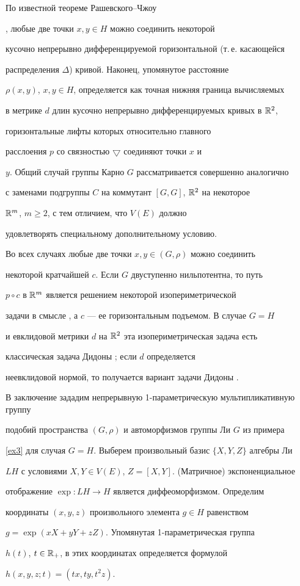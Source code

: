 \begin{exams}
По известной теореме Рашевского--Чжоу


\cite{R}, \cite{Ch} любые две точки $x,y \in H$ можно соединить некоторой


кусочно непрерывно дифференцируемой горизонтальной (т.\,е. касающейся


распределения $\Delta$) кривой. Наконец, упомянутое расстояние


$\rho(x,y)$, $x,y \in H$, определяется как точная нижняя граница вычисляемых


в метрике $d$ длин кусочно непрерывно дифференцируемых кривых в $\Bbb{R}^{2}$,


горизонтальные лифты которых \cite{KN} относительно главного


расслоения $p$ со связностью $\bigtriangledown$ соединяют точки $x$ и


$y$. Общий случай группы Карно $G$ рассматривается совершенно аналогично


с заменами подгруппы $C$ на коммутант $[G,G]$, $\Bbb{R}^{2}$ на некоторое


$\Bbb{R}^{m}$, $m \geq 2$, с тем отличием, что $V(E)$ должно


удовлетворять специальному дополнительному условию.





Во всех случаях любые две точки $x,y \in (G,\rho)$ можно соединить


некоторой кратчайшей $c$. Если $G$ двуступенно нильпотентна, то путь


$p\circ{c}$ в $\Bbb{R}^{m}$ является решением некоторой изопериметрической


задачи в смысле \cite{IT}, а $c$ --- ее горизонтальным подъемом. В случае $G=H$


и евклидовой метрики $d$ на $\Bbb{R}^{2}$ эта изопериметрическая задача есть


классическая задача Дидоны \cite{BZ}; если $d$ определяется


неевклидовой нормой, то получается вариант задачи Дидоны \cite{BH}.





В заключение зададим непрерывную 1-параметрическую мультипликативную группу


подобий пространства $(G,\rho)$ и автоморфизмов группы Ли $G$ из примера


\ref{ex3} для случая $G=H$. Выберем произвольный базис $\{X,Y,Z\}$ алгебры Ли


$LH$ с условиями $X,Y \in V(E)$, $Z=[X,Y]$. (Матричное) экспоненциальное


отображение $\exp: LH \rightarrow H$ является диффеоморфизмом. Определим


координаты $(x,y,z)$ произвольного элемента $g \in H$ равенством


$g=\exp(xX+yY+zZ)$. Упомянутая 1-параметрическая группа


$h(t)$, $t \in \Bbb{R}_{+}$, в этих координатах определяется формулой


$h(x,y,z;t)=(tx,ty,t^{2}z)$.


\end{exams}
